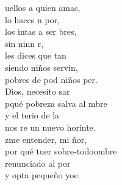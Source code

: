 \begin{cancion}
	uellos a quien amas,\\
	lo haces n por,\\
	los intas a ser bres, \\
	sin ninn r,\\
	les dices que tan \\
	siendo niños servin, \\
	pobres de pod niños  per.\\
	 Dios, necesito sar\\
	pqué  pobreza salva al mbre\\
	y el terio de la \\
	nos re un nuevo horinte.   \\
	zme entender, mi ñor,\\
	por qué tuer sobre-todoombre\\
	 renunciado al por\\
	y opta  pequeño yoe.\\
\end{cancion}%
